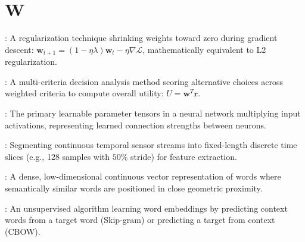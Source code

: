 \section*{W}
\begin{description}[leftmargin=!,labelwidth=4.5cm,itemsep=1.5ex]
\item[\textbf{Weight Decay}\hfill \textnormal{\sffamily\scriptsize\color{keyideablue}[Deep Learning]}]: A regularization technique shrinking weights toward zero during gradient descent: $\mathbf{w}_{t+1} = (1 - \eta \lambda) \mathbf{w}_t - \eta \nabla \mathcal{L}$, mathematically equivalent to L2 regularization.
\item[\textbf{Weighted Sum Model (WSM)}\hfill \textnormal{\sffamily\scriptsize\color{keyideablue}[Decision Analysis]}]: A multi-criteria decision analysis method scoring alternative choices across weighted criteria to compute overall utility: $U = \mathbf{w}^T \mathbf{r}$.
\item[\textbf{Weights (W)}\hfill \textnormal{\sffamily\scriptsize\color{keyideablue}[Deep Learning]}]: The primary learnable parameter tensors in a neural network multiplying input activations, representing learned connection strengths between neurons.
\item[\textbf{Windowing}\hfill \textnormal{\sffamily\scriptsize\color{keyideablue}[Signal Processing]}]: Segmenting continuous temporal sensor streams into fixed-length discrete time slices (e.g., 128 samples with $50\%$ stride) for feature extraction.
\item[\textbf{Word Embedding}\hfill \textnormal{\sffamily\scriptsize\color{keyideablue}[NLP]}]: A dense, low-dimensional continuous vector representation of words where semantically similar words are positioned in close geometric proximity.
\item[\textbf{Word2Vec}\hfill \textnormal{\sffamily\scriptsize\color{keyideablue}[NLP]}]: An unsupervised algorithm learning word embeddings by predicting context words from a target word (Skip-gram) or predicting a target from context (CBOW).
\end{description}

